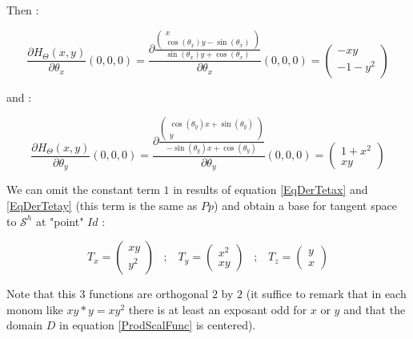 Then :

\begin{equation}
	\frac{\partial H_\Theta(x,y)}{\partial \theta_x} (0,0,0) 
		= \frac{\partial \frac{\begin{pmatrix} x \\  \cos(\theta_x) y-  \sin(\theta_x)  \end{pmatrix}}
			{\sin(\theta_x) y+\cos(\theta_x)}}{\partial \theta_x} (0,0,0)
		=  \begin{pmatrix} -xy \\ -1 -y^2 \end{pmatrix} 
      \label{EqDerTetax}
\end{equation}

and :

\begin{equation}
	\frac{\partial H_\Theta(x,y)}{\partial \theta_y} (0,0,0) 
		= \frac{\partial \frac{\begin{pmatrix}   \cos(\theta_y) x+  \sin(\theta_y)  \\ y \end{pmatrix}}
			{-\sin(\theta_y) x+\cos(\theta_y)}}{\partial \theta_y} (0,0,0)
		=  \begin{pmatrix} 1+x^2 \\ xy  \end{pmatrix} 
      \label{EqDerTetay}
\end{equation}

We can omit the constant term $1$ in results of equation \ref{EqDerTetax} and  \ref{EqDerTetay} (this
term is the same as $Pp$)  and obtain a base
for tangent space to  $\mathcal{S}^h$  at "point"  $Id$ :


\begin{equation}
	T_x= \begin{pmatrix}   xy  \\  y^2  \end{pmatrix}
\;\;\;  ; \;\;\;  
	T_y =\begin{pmatrix}   x^2 \\  xy   \end{pmatrix}
\;\;\;  ; \;\;\;  
	T_z = \begin{pmatrix}   y   \\  x \end{pmatrix}
		\label{Basis:Rot2D}
\end{equation}

Note that this $3$ functions are orthogonal $2$ by $2$ (it suffice to remark
that in each monom like $xy * y= xy^2$ there is at least an exposant odd for $x$ or $y$ and that
the domain $D$ in equation \ref{ProdScalFunc} is centered).

